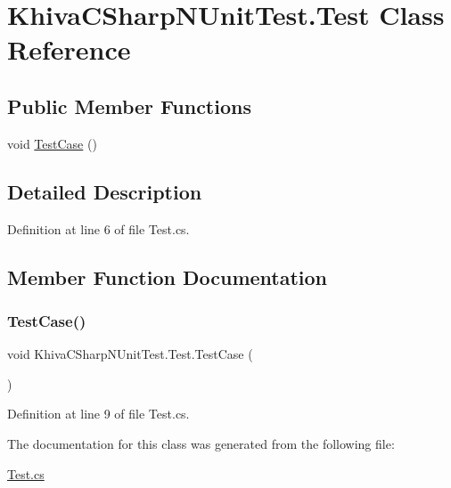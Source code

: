 \hypertarget{class_khiva_c_sharp_n_unit_test_1_1_test}{}\section{Khiva\+C\+Sharp\+N\+Unit\+Test.\+Test Class Reference}
\label{class_khiva_c_sharp_n_unit_test_1_1_test}
\subsection*{Public Member Functions}
\begin{DoxyCompactItemize}
\item 
void \mbox{\hyperlink{class_khiva_c_sharp_n_unit_test_1_1_test_ab8943fa04f6cf5124c623d97e1c22300}{Test\+Case}} ()
\end{DoxyCompactItemize}


\subsection{Detailed Description}


Definition at line 6 of file Test.\+cs.



\subsection{Member Function Documentation}
\mbox{\label{class_khiva_c_sharp_n_unit_test_1_1_test_ab8943fa04f6cf5124c623d97e1c22300}} 
\subsubsection{\texorpdfstring{Test\+Case()}{TestCase()}}
{\footnotesize\ttfamily void Khiva\+C\+Sharp\+N\+Unit\+Test.\+Test.\+Test\+Case (\begin{DoxyParamCaption}{ }\end{DoxyParamCaption})\hspace{0.3cm}{\ttfamily [inline]}}



Definition at line 9 of file Test.\+cs.



The documentation for this class was generated from the following file\+:\begin{DoxyCompactItemize}
\item 
\mbox{\hyperlink{_test_8cs}{Test.\+cs}}\end{DoxyCompactItemize}
